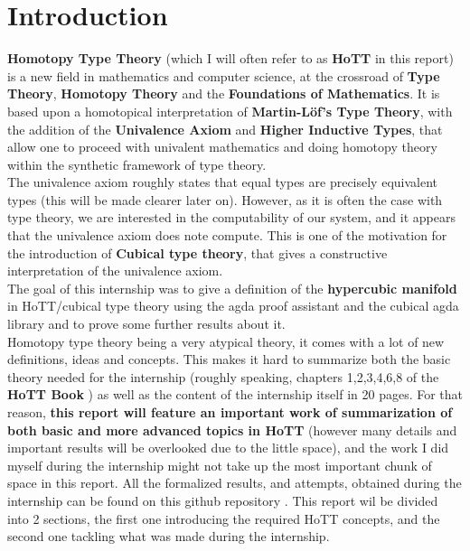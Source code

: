 \documentclass{report}
\begin{document}
\section{Introduction}
\textbf{Homotopy Type Theory} (which I will often refer to as \textbf{HoTT} in this report) is a new field in mathematics and computer science, at the crossroad of \textbf{Type Theory}, \textbf{Homotopy Theory} and the \textbf{Foundations of Mathematics}. It is based upon a homotopical interpretation of \textbf{Martin-Löf's Type Theory}, with the addition of the \textbf{Univalence Axiom} and \textbf{Higher Inductive Types}, that allow one to proceed with univalent mathematics and doing homotopy theory within the synthetic framework of type theory.\\
The univalence axiom roughly states that equal types are precisely equivalent types (this will be made clearer later on). However, as it is often the case with type theory, we are interested in the computability of our system, and it appears that the univalence axiom does note compute. This is one of the motivation for the introduction of \textbf{Cubical type theory}, that gives a constructive interpretation of the univalence axiom.\\
The goal of this internship was to give a definition of the \textbf{hypercubic manifold} \cite{hypercubic} in HoTT/cubical type theory using the agda proof assistant and the cubical agda library \cite{cubicalagda} and to prove some further results about it.\\
Homotopy type theory being a very atypical theory, it comes with a lot of new definitions, ideas and concepts. This makes it hard to summarize both the basic theory needed for the internship (roughly speaking, chapters 1,2,3,4,6,8 of the \textbf{HoTT Book} \cite{hott}) as well as the content of the internship itself in 20 pages. For that reason, \textbf{this report will feature an important work of summarization of both basic and more advanced topics in HoTT} (however many details and important results will be overlooked due to the little space), and the work I did myself during the internship might not take up the most important chunk of space in this report. All the formalized results, and attempts, obtained during the internship can be found on this github repository \cite{repo}. This report wil be divided into 2 sections, the first one introducing the required HoTT concepts, and the second one tackling what was made during the internship.
\end{document}
